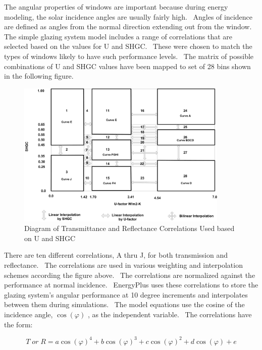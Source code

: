 The angular properties of windows are important because during energy modeling, the solar incidence angles are usually fairly high.~ Angles of incidence are defined as angles from the normal direction extending out from the window.~ The simple glazing system model includes a range of correlations that are selected based on the values for U and SHGC.~ These were chosen to match the types of windows likely to have such performance levels.~ The matrix of possible combinations of U and SHGC values have been mapped to set of 28 bins shown in the following figure.

\begin{figure}[hbtp] %
\centering
\includegraphics[width=0.9\textwidth, height=0.9\textheight, keepaspectratio=true]{media/image947.png}
\caption{Diagram of Transmittance and Reflectance Correlations Used based on U and SHGC \label{fig:diagram-of-transmittance-and}}
\end{figure}

There are ten different correlations, A thru J, for both transmission and reflectance.~ The correlations are used in various weighting and interpolation schemes according the figure above.~ The correlations are normalized against the performance at normal incidence.~ EnergyPlus uses these correlations to store the glazing system's angular performance at 10 degree increments and interpolates between them during simulations.~ The model equations use the cosine of the incidence angle, \(\cos (\varphi )\) , as the independent variable.~ The correlations have the form:

\begin{equation}
T\;or\;R = a\cos {(\varphi )^4} + b\cos {(\varphi )^3} + c\cos {(\varphi )^2} + d\cos (\varphi ) + e
\end{equation}

